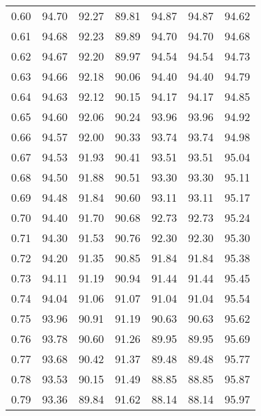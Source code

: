 \begin{tabular}{|c|c|c|c|c|c|c|}
      0.60 &     94.70 &     92.27 &      89.81 &   94.87 &      94.87 &         94.62 \\
      0.61 &     94.68 &     92.23 &      89.89 &   94.70 &      94.70 &         94.68 \\
      0.62 &     94.67 &     92.20 &      89.97 &   94.54 &      94.54 &         94.73 \\
      0.63 &     94.66 &     92.18 &      90.06 &   94.40 &      94.40 &         94.79 \\
      0.64 &     94.63 &     92.12 &      90.15 &   94.17 &      94.17 &         94.85 \\
      0.65 &     94.60 &     92.06 &      90.24 &   93.96 &      93.96 &         94.92 \\
      0.66 &     94.57 &     92.00 &      90.33 &   93.74 &      93.74 &         94.98 \\
      0.67 &     94.53 &     91.93 &      90.41 &   93.51 &      93.51 &         95.04 \\
      0.68 &     94.50 &     91.88 &      90.51 &   93.30 &      93.30 &         95.11 \\
      0.69 &     94.48 &     91.84 &      90.60 &   93.11 &      93.11 &         95.17 \\
      0.70 &     94.40 &     91.70 &      90.68 &   92.73 &      92.73 &         95.24 \\
      0.71 &     94.30 &     91.53 &      90.76 &   92.30 &      92.30 &         95.30 \\
      0.72 &     94.20 &     91.35 &      90.85 &   91.84 &      91.84 &         95.38 \\
      0.73 &     94.11 &     91.19 &      90.94 &   91.44 &      91.44 &         95.45 \\
      0.74 &     94.04 &     91.06 &      91.07 &   91.04 &      91.04 &         95.54 \\
      0.75 &     93.96 &     90.91 &      91.19 &   90.63 &      90.63 &         95.62 \\
      0.76 &     93.78 &     90.60 &      91.26 &   89.95 &      89.95 &         95.69 \\
      0.77 &     93.68 &     90.42 &      91.37 &   89.48 &      89.48 &         95.77 \\
      0.78 &     93.53 &     90.15 &      91.49 &   88.85 &      88.85 &         95.87 \\
      0.79 &     93.36 &     89.84 &      91.62 &   88.14 &      88.14 &         95.97 \\

\end{tabular}
